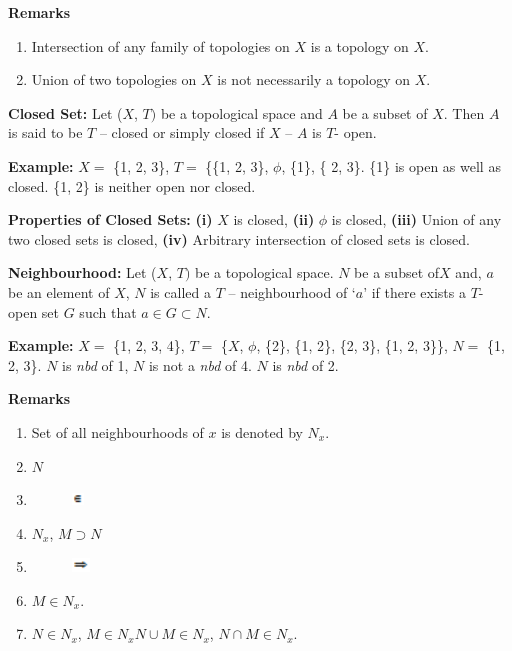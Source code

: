 \documentclass[12pt]{amsart}
\begin{document}
\textbf{Remarks}

\begin{enumerate}
\item Intersection of any family of topologies on $X$ is a topology on $X$.
\item Union of two topologies on $X$ is not necessarily a topology on $X$.
\end{enumerate}

\textbf{Closed Set:} Let ($X$, $T)$ be a topological space and $A$ be a subset of 
$X$. Then $A$ is said to be $T$ -- closed or simply closed if $X$ -- $A$ is $T$- open.

\textbf{Example:} $X =$ {\{}1, 2, 3{\}}, $T =$ {\{}{\{}1, 2, 3{\}}, $\phi $, 
{\{}1{\}}, {\{} 2, 3{\}}. {\{}1{\}} is open as well as closed. {\{}1, 2{\}} 
is neither open nor closed.

\textbf{Properties of Closed Sets:} \textbf{(i)} $X$ is closed, \textbf{(ii)} 
$\phi $ is closed, \textbf{(iii)} Union of any two closed sets is 
closed,\textbf{ (iv)} Arbitrary intersection of closed sets is closed.

\textbf{Neighbourhood:} Let ($X$, $T)$ be a topological space. $N$ be a subset of$ X$ 
and, $a$ be an element of $X$, $N$ is called a $T$ -- neighbourhood of `$a$' if there 
exists a $T$-open set $G$ such that $a\in G\subset N$.

\textbf{Example:} $X =$ {\{}1, 2, 3, 4{\}}, $T =$ {\{}$X$, $\phi $, {\{}2{\}}, {\{}1, 
2{\}}, {\{}2, 3{\}}, {\{}1, 2, 3{\}}{\}}, $N =$ {\{}1, 2, 3{\}}. $N$ is \textit{nbd} of 1, $N$ is 
not a \textit{nbd} of 4. $N$ is \textit{nbd} of 2.

\textbf{Remarks}

\begin{enumerate}
\item Set of all neighbourhoods of $x$ is denoted by $N_{x}$.
\item $N $
\item \begin{figure}[htbp]
\centerline{\includegraphics[width=0.13in,height=0.13in]{topology1.pdf}}
\label{fig1}
\end{figure}

\item $N_{x}$, $M \supset N $
\item \begin{figure}[htbp]
\centerline{\includegraphics[width=0.19in,height=0.15in]{topology2.pdf}}
\label{fig2}
\end{figure}

\item $M \in N_{x}$.
\item $N \in N_{x}$, $M\in N_{x}N \cup M \in N_{x}$, $N \cap M \in N_{x}$.
\end{enumerate}
\end{document}

